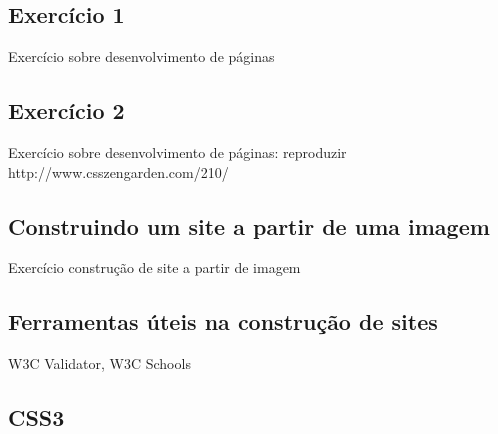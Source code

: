 \subsection{Exercício 1}
Exercício sobre desenvolvimento de páginas

\subsection{Exercício 2}
Exercício sobre desenvolvimento de páginas: reproduzir http://www.csszengarden.com/210/

\subsection{Construindo um site a partir de uma imagem}
Exercício construção de site a partir de imagem

\subsection{Ferramentas úteis na construção de sites}
W3C Validator, W3C Schools

\subsection{CSS3}
